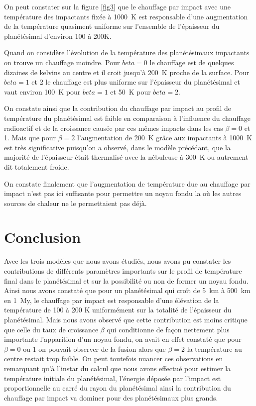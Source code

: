 \documentclass[10pt,a4paper]{article}
\numberwithin{equation}{section}
\begin{document}
On peut constater sur la figure \ref{fig3} que le chauffage par impact avec une température des impactants fixée à \SI{1000}{K} est responsable d'une augmentation de la température quasiment uniforme sur l'ensemble de l'épaisseur du planétésimal d'environ 100 à 200K. 

Quand on considère l'évolution de la température des planétésimaux impactants on trouve un chauffage moindre. Pour $beta = 0$ le chauffage est de quelques dizaines de kelvins au centre et il croit jusqu'à \SI{200}{K} proche de la surface. Pour $beta = 1$ et 2 le chauffage est plus uniforme sur l'épaisseur du planétésimal et vaut environ \SI{100}{K} pour $beta = 1$ et \SI{50}{K} pour $beta = 2$.

On constate ainsi que la contribution du chauffage par impact au profil de température du planétésimal est faible en comparaison à l'influence du chauffage radioactif et de la croissance causée par ces mêmes impacts dans les cas $\beta=0$ et 1. Mais que pour $\beta = 2$ l’augmentation de \SI{200}{K} grâce aux impactants à \SI{1000}{K} est très significative puisqu'on a observé, dans le modèle précédant, que la majorité de l'épaisseur était thermalisé avec la nébuleuse à \SI{300}{K} ou autrement dit totalement froide.

On constate finalement que l'augmentation de température due au chauffage par impact n'est pas ici suffisante pour permettre un noyau fondu la où les autres sources de chaleur ne le permettaient pas déjà.


\section*{Conclusion}

Avec les trois modèles que nous avons étudiés, nous avons pu constater les contributions de différents paramètres importants sur le profil de température final dans le planétésimal et sur la possibilité ou non de former un noyau fondu. Ainsi nous avons constaté que pour un planétésimal qui croît de \SI{5}{km} à \SI{500}{km} en \SI{1}{My}, le chauffage par impact est responsable d'une élévation de la température de 100 à 200 K uniformément sur la totalité de l'épaisseur du planétésimal. Mais nous avons observé que cette contribution est moins critique que celle du taux de croissance $\beta$ qui conditionne de façon nettement plus importante l'apparition d'un noyau fondu, on avait en effet constaté que pour $\beta = 0$ ou 1 on pouvait observer de la fusion alors que $\beta=2$ la température au centre restait trop faible.
On peut toutefois nuancer ces observations en remarquant qu'à l'instar du calcul que nous avons effectué pour estimer la température initiale du planétésimal, l'énergie déposée par l'impact est proportionnelle au carré du rayon du planétésimal ainsi la contribution du chauffage par impact va dominer pour des planétésimaux plus grands.
\end{document}
